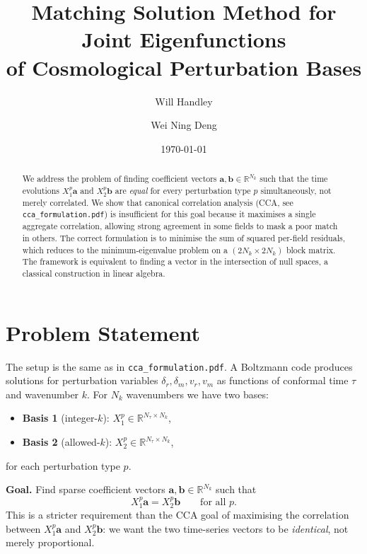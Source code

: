 \documentclass[a4paper,11pt]{article}
\title{Matching Solution Method for Joint Eigenfunctions\\
       of Cosmological Perturbation Bases}
\author{Will Handley \and Wei Ning Deng}
\date{\today}
\newcommand{\va}{\bm{a}}
\newcommand{\vb}{\bm{b}}
\newcommand{\Xb}[2]{X_{#1}^{#2}}
\newcommand{\Nk}{N_k}
\newcommand{\Nt}{N_\tau}
\theoremstyle{plain}
\begin{document}
\maketitle

\begin{abstract}
We address the problem of finding coefficient vectors $\va, \vb \in \mathbb{R}^{\Nk}$
such that the time evolutions $\Xb{1}{p}\va$ and $\Xb{2}{p}\vb$ are \emph{equal} for
every perturbation type $p$ simultaneously, not merely correlated.
We show that canonical correlation analysis (CCA, see \texttt{cca\_formulation.pdf})
is insufficient for this goal because it maximises a single aggregate correlation,
allowing strong agreement in some fields to mask a poor match in others.
The correct formulation is to minimise the sum of squared per-field residuals, which
reduces to the minimum-eigenvalue problem on a $(2\Nk\times 2\Nk)$ block matrix.
The framework is equivalent to finding a vector in the intersection of null spaces,
a classical construction in linear algebra.
\end{abstract}

\section{Problem Statement}
\label{sec:problem}

The setup is the same as in \texttt{cca\_formulation.pdf}.
A Boltzmann code produces solutions for perturbation variables
$\delta_r, \delta_m, v_r, v_m$ as functions of conformal time $\tau$ and
wavenumber $k$.
For $\Nk$ wavenumbers we have two bases:
\begin{itemize}
    \item \textbf{Basis 1} (integer-$k$): $\Xb{1}{p} \in \mathbb{R}^{\Nt\times\Nk}$,
    \item \textbf{Basis 2} (allowed-$k$): $\Xb{2}{p} \in \mathbb{R}^{\Nt\times\Nk}$,
\end{itemize}
for each perturbation type $p$.

\textbf{Goal.} Find sparse coefficient vectors $\va, \vb \in \mathbb{R}^{\Nk}$
such that
\begin{equation}
    \Xb{1}{p}\va = \Xb{2}{p}\vb \qquad \text{for all } p.
    \label{eq:goal}
\end{equation}
This is a stricter requirement than the CCA goal of maximising the correlation
between $\Xb{1}{p}\va$ and $\Xb{2}{p}\vb$: we want the two time-series vectors
to be \emph{identical}, not merely proportional.
\end{document}

